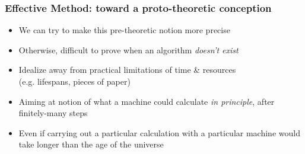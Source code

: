 \begin{frame}
\frametitle{Effective Method: toward a proto-theoretic conception}

\begin{itemize}[<+->]

\item We can try to make this pre-theoretic notion more precise
\item[] Otherwise, difficult to prove when an algorithm \textit{doesn't exist}


\item Idealize away from practical limitations of time \& resources \\ (e.g. lifespans, pieces of paper)

\item Aiming at notion of what a machine could calculate \textit{in principle}, after \textcolor{highlightA}{finitely-many} steps

\item Even if carrying out a particular calculation with a particular machine would take longer than the age of the universe 


\end{itemize}
\end{frame}

